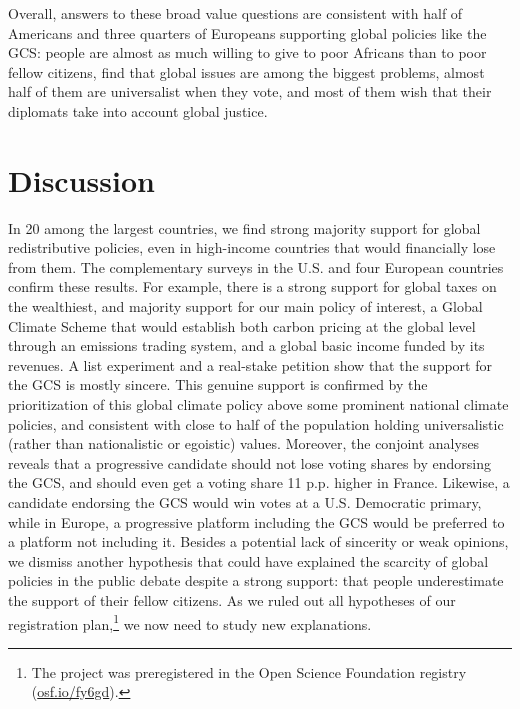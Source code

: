 Overall, answers to these broad value questions are consistent with half of Americans and three quarters of Europeans supporting global policies like the GCS: people are almost as much willing to give to poor Africans than to poor fellow citizens, find that global issues are among the biggest problems, almost half of them are universalist when they vote, and most of them wish that their diplomats take into account global justice.


\section{Discussion} %
In 20 among the largest countries, we find strong majority support for global redistributive policies, even in high-income countries that would financially lose from them. %
The complementary surveys in the U.S. and four European countries confirm these results. For example, there is a strong support for global taxes on the wealthiest, and majority support for our main policy of interest, a Global Climate Scheme that would establish both carbon pricing at the global level through an emissions trading system, and a global basic income funded by its revenues. A list experiment and a real-stake petition show that the support for the GCS is mostly sincere. This genuine support is confirmed by the prioritization of this global climate policy above some prominent national climate policies, and consistent with close to half of the population holding universalistic (rather than nationalistic or egoistic) values. Moreover, the conjoint analyses reveals that a progressive candidate should not lose voting shares by endorsing the GCS, and should even get a voting share 11 p.p. higher in France. Likewise, a candidate endorsing the GCS would win votes at a U.S. Democratic primary, while in Europe, a progressive platform including the GCS would be preferred to a platform not including it. %
Besides a potential lack of sincerity or weak opinions, we dismiss another hypothesis that could have explained the scarcity of global policies in the public debate despite a strong support: that people underestimate the support of their fellow citizens. As we ruled out all hypotheses of our registration plan,\footnote{The project was preregistered in the Open Science Foundation registry (\href{https://osf.io/fy6gd}{osf.io/fy6gd}).} we now need to study new explanations. %

